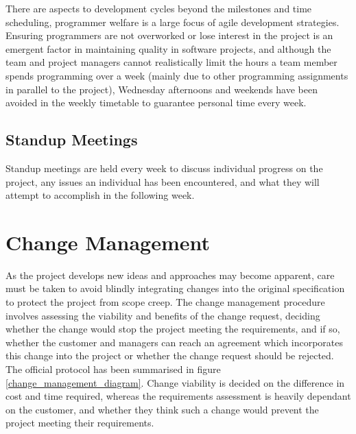 \begin{fullwidth}
\begin{fullwidth}
There are aspects to development cycles beyond the milestones and time scheduling, programmer welfare is a large focus of agile development strategies. Ensuring programmers are not overworked or lose interest in the project is an emergent factor in maintaining quality in software projects, and although the team and project managers cannot realistically limit the hours a team member spends programming over a week (mainly due to other programming assignments in parallel to the project), Wednesday afternoons and weekends have been avoided in the weekly timetable to guarantee personal time every week.

\subsection{Standup Meetings}
Standup meetings are held every week to discuss individual progress on the project, any issues an individual has been encountered, and what they will attempt to accomplish in the following week.

\section{Change Management}
As the project develops new ideas and approaches may become apparent, care must be taken to avoid blindly integrating changes into the original specification to protect the project from scope creep. The change management procedure involves assessing the viability and benefits of the change request, deciding whether the change would stop the project meeting the requirements, and if so, whether the customer and managers can reach an agreement which incorporates this change into the project or whether the change request should be rejected. The official protocol has been summarised in figure \ref{change_management_diagram}. Change viability is decided on the difference in cost and time required, whereas the requirements assessment is heavily dependant on the customer, and whether they think such a change would prevent the project meeting their requirements.

\end{fullwidth}
\clearpage


\end{fullwidth}

